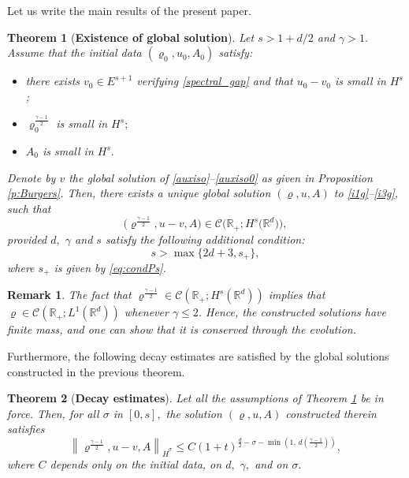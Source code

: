 \documentclass[11pt,twoside]{amsart}
\newtheorem{thm}{Theorem}[section]
\newtheorem{rem}{Remark}[section]
\newcommand{\vr}{\varrho}
\newcommand\R{\mathbb{R}}
\def\cC{{\mathcal C}}
\begin{document}
Let us write the  main results of the present paper. 
\begin{thm}[\textbf{Existence of global solution}]
\label{isentro}
Let $s>1+d/2$ and $\gamma>1.$  Assume that the initial data $(\varrho_0,u_0,A_0)$ satisfy:
\vspace*{.1cm}
\begin{itemize}
[label=$\bf (H1)$,leftmargin=1.5cm]
\item\label{Hypo-1}
 there exists $v_0 \in E^{s+1}$ verifying  \ref{spectral_gap}
and that $u_0-v_0$ is small in $H^s$;
\end{itemize}
\begin{itemize}
[label=$\bf (H2)$,leftmargin=1.5cm]
\item\label{Hypo-2} $\vr_0^{\frac{\gamma-1}{2}}$ is small  in $H^s;$
\end{itemize}
\begin{itemize}
[label=$\bf (H3)$,leftmargin=1.5cm]
\item\label{Hypo-3} $A_0$ is small  in $H^s.$
\end{itemize}

Denote by  $ v$  the global solution of \eqref{auxiso}--\eqref{auxiso0}  as given in  Proposition
\ref{p:Burgers}. 
Then, there exists a unique global solution $\left(\vr,u,A\right)$ to
\eqref{i1g}--\eqref{i3g}, such that 
\[
\bigl(\vr^{\frac{\gamma-1}{2}},u- v,A\bigr) \in
\cC\bigl(\R_+;H^{s}\bigl(\R^d\bigr) \bigr),
\]
provided $d,$ $\gamma$ and $s$ satisfy the following additional condition:
$$
s>\max\{2d+3,s_+\},
$$
where $s_+$ is given by \eqref{eq:condPs}.
\end{thm}
\begin{rem}\label{r:finitemass} The fact that $\varrho^{\frac{\gamma-1}2}\in \cC(\R_+;H^s(\R^d))$
implies that $\varrho\in\cC(\R_+;L^1(\R^d))$ whenever $\gamma\leq2$. 
Hence, the constructed solutions have finite mass, and one can show that it is conserved
through the evolution.
\end{rem}

Furthermore, the following decay estimates  are satisfied by  the global solutions constructed in the previous theorem. 

%


\begin{thm}[\textbf{Decay estimates}]\label{decay}
Let all the assumptions of  Theorem \ref{isentro} be in force.  Then, for all $\sigma$ in $[0,s],$
 the solution $(\vr,u,A)$ constructed therein satisfies
$$
\left\|\vr^{\frac{\gamma-1}{2}},u- v, A\right\|_{\dot H^\sigma}\leq C (1+t)^{\frac d2-\sigma
-\min\left(1, \, d(\frac{\gamma-1}2)\right)},
$$
where $C$ depends only on the initial data, on $d,$ $\gamma,$
 and on $\sigma.$ 
\end{thm}
  
\end{document}
